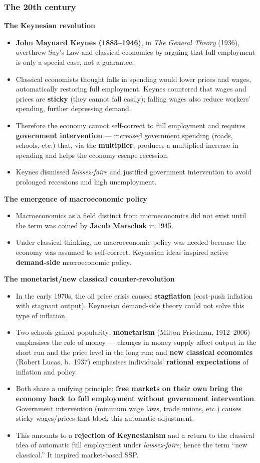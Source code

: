 \documentclass[a4paper,12pt]{article}
\begin{document}
\subsubsection*{The 20th century}
\textbf{The Keynesian revolution}
\begin{itemize}
  \item \textbf{John Maynard Keynes (1883--1946)}, in \textit{The General Theory} (1936), overthrew Say's Law and classical economics by arguing that full employment is only a special case, not a guarantee.
  \item Classical economists thought falls in spending would lower prices and wages, automatically restoring full employment. Keynes countered that wages and prices are \textbf{sticky} (they cannot fall easily); falling wages also reduce workers' spending, further depressing demand.
  \item Therefore the economy cannot self-correct to full employment and requires \textbf{government intervention} --- increased government spending (roads, schools, etc.) that, via the \textbf{multiplier}, produces a multiplied increase in spending and helps the economy escape recession.
  \item Keynes dismissed \textit{laissez-faire} and justified government intervention to avoid prolonged recessions and high unemployment.
\end{itemize}
\textbf{The emergence of macroeconomic policy}
\begin{itemize}
  \item Macroeconomics as a field distinct from microeconomics did not exist until the term was coined by \textbf{Jacob Marschak} in 1945.
  \item Under classical thinking, no macroeconomic policy was needed because the economy was assumed to self-correct. Keynesian ideas inspired active \textbf{demand-side} macroeconomic policy.
\end{itemize}
\textbf{The monetarist/new classical counter-revolution}
\begin{itemize}
  \item In the early 1970s, the oil price crisis caused \textbf{stagflation} (cost-push inflation with stagnant output). Keynesian demand-side theory could not solve this type of inflation.
  \item Two schools gained popularity: \textbf{monetarism} (Milton Friedman, 1912--2006) emphasises the role of money --- changes in money supply affect output in the short run and the price level in the long run; and \textbf{new classical economics} (Robert Lucas, b.\ 1937) emphasises individuals' \textbf{rational expectations} of inflation and policy.
  \item Both share a unifying principle: \textbf{free markets on their own bring the economy back to full employment without government intervention}. Government intervention (minimum wage laws, trade unions, etc.) causes sticky wages/prices that block this automatic adjustment.
  \item This amounts to a \textbf{rejection of Keynesianism} and a return to the classical idea of automatic full employment under \textit{laissez-faire}; hence the term ``new classical.'' It inspired market-based SSP.
\end{itemize}
\end{document}
